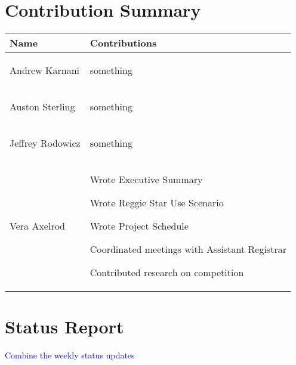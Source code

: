 \documentclass[11pt]{article}
\newenvironment{packed_itemize}{
\begin{itemize}
  \setlength{\itemsep}{1pt}
  \setlength{\parskip}{0pt}
  \setlength{\parsep}{0pt}
}{\end{itemize}}
\begin{document}
\section{Contribution Summary} %
\begin{tabular}{|p{1.4in}|p{4in}|}
\hline
\textbf{Name}     & \textbf{Contributions} \\
\hline\hline
 Andrew Karnani
	& 
	 \begin{packed_itemize} 
	\vspace{-0.15in}
		\item something
	\end{packed_itemize}
	\vspace{-0.4in}
\\
\hline
 Auston Sterling
	& 
	 \begin{packed_itemize} 
	\vspace{-0.15in}
		\item something
	\end{packed_itemize}
	\vspace{-0.4in}
\\
\hline
Jeffrey Rodowicz
	& 
	 \begin{packed_itemize} 
	\vspace{-0.15in}
		\item something
	\end{packed_itemize}
	\vspace{-0.4in}
\\
\hline
Vera Axelrod
	& 
	 \begin{packed_itemize} 
	\vspace{-0.15in}
		\item Wrote Executive Summary 
		\item Wrote Reggie Star Use Scenario
		\item Wrote Project Schedule
		\item Coordinated meetings with Assistant Registrar
		\item Contributed research on competition
	\end{packed_itemize}
	\vspace{-0.4in}
\\
\hline
\end{tabular}


\section{Status Report} %
\textcolor{blue}{Combine the weekly status updates}
\end{document}
